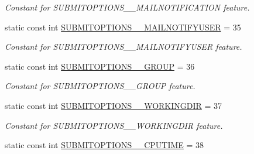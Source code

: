 \begin{DoxyCompactItemize}
\begin{DoxyCompactList}\small\item\em Constant for SUBMITOPTIONS\_\-\_\-MAILNOTIFICATION feature. \item\end{DoxyCompactList}\item 
\hypertarget{classTMS__Data_1_1TMS__DataPackage_a45134c72cb6174ac1ff3666f28f617e9}{
static const int \hyperlink{classTMS__Data_1_1TMS__DataPackage_a45134c72cb6174ac1ff3666f28f617e9}{SUBMITOPTIONS\_\-\_\-MAILNOTIFYUSER} = 35}
\label{classTMS__Data_1_1TMS__DataPackage_a45134c72cb6174ac1ff3666f28f617e9}

\begin{DoxyCompactList}\small\item\em Constant for SUBMITOPTIONS\_\-\_\-MAILNOTIFYUSER feature. \item\end{DoxyCompactList}\item 
\hypertarget{classTMS__Data_1_1TMS__DataPackage_aa4ed3590a68b2d8bd350a6c0fa6f9be4}{
static const int \hyperlink{classTMS__Data_1_1TMS__DataPackage_aa4ed3590a68b2d8bd350a6c0fa6f9be4}{SUBMITOPTIONS\_\-\_\-GROUP} = 36}
\label{classTMS__Data_1_1TMS__DataPackage_aa4ed3590a68b2d8bd350a6c0fa6f9be4}

\begin{DoxyCompactList}\small\item\em Constant for SUBMITOPTIONS\_\-\_\-GROUP feature. \item\end{DoxyCompactList}\item 
\hypertarget{classTMS__Data_1_1TMS__DataPackage_ad1d67f980992f800016c2e493b78fcbb}{
static const int \hyperlink{classTMS__Data_1_1TMS__DataPackage_ad1d67f980992f800016c2e493b78fcbb}{SUBMITOPTIONS\_\-\_\-WORKINGDIR} = 37}
\label{classTMS__Data_1_1TMS__DataPackage_ad1d67f980992f800016c2e493b78fcbb}

\begin{DoxyCompactList}\small\item\em Constant for SUBMITOPTIONS\_\-\_\-WORKINGDIR feature. \item\end{DoxyCompactList}\item 
\hypertarget{classTMS__Data_1_1TMS__DataPackage_a1b06493375821bec029904f275f6f93b}{
static const int \hyperlink{classTMS__Data_1_1TMS__DataPackage_a1b06493375821bec029904f275f6f93b}{SUBMITOPTIONS\_\-\_\-CPUTIME} = 38}
\label{classTMS__Data_1_1TMS__DataPackage_a1b06493375821bec029904f275f6f93b}


\end{DoxyCompactItemize}
